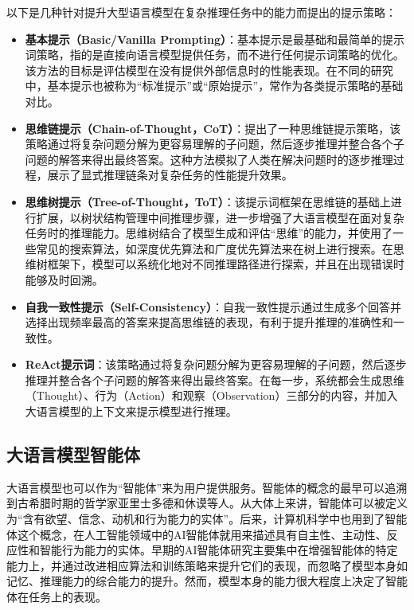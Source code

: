 以下是几种针对提升大型语言模型在复杂推理任务中的能力而提出的提示策略：

\begin{itemize}
    \item \textbf{基本提示（Basic/Vanilla Prompting）}：基本提示是最基础和最简单的提示词策略，指的是直接向语言模型提供任务，而不进行任何提示词策略的优化。该方法的目标是评估模型在没有提供外部信息时的性能表现。在不同的研究中，基本提示也被称为“标准提示”或“原始提示”，常作为各类提示策略的基础对比。
    \item \textbf{思维链提示（Chain-of-Thought，CoT）}：\cite{Wang2023a}提出了一种思维链提示策略，该策略通过将复杂问题分解为更容易理解的子问题，然后逐步推理并整合各个子问题的解答来得出最终答案。这种方法模拟了人类在解决问题时的逐步推理过程，展示了显式推理链条对复杂任务的性能提升效果。
    \item \textbf{思维树提示（Tree-of-Thought，ToT）}：该提示词框架在思维链的基础上进行扩展，以树状结构管理中间推理步骤，进一步增强了大语言模型在面对复杂任务时的推理能力。思维树结合了模型生成和评估“思维”的能力，并使用了一些常见的搜索算法，如深度优先算法和广度优先算法来在树上进行搜索。在思维树框架下，模型可以系统化地对不同推理路径进行探索，并且在出现错误时能够及时回溯。
    \item \textbf{自我一致性提示（Self-Consistency）}：自我一致性提示通过生成多个回答并选择出现频率最高的答案来提高思维链的表现，有利于提升推理的准确性和一致性。
    \item \textbf{ReAct提示词}：该策略通过将复杂问题分解为更容易理解的子问题，然后逐步推理并整合各个子问题的解答来得出最终答案。在每一步，系统都会生成思维（Thought）、行为（Action）和观察（Observation）三部分的内容，并加入大语言模型的上下文来提示模型进行推理。
\end{itemize}

\subsection{大语言模型智能体}

大语言模型也可以作为“智能体”来为用户提供服务。智能体的概念的最早可以追溯到古希腊时期的哲学家亚里士多德和休谟等人\cite{Zalta2019}。从大体上来讲，智能体可以被定义为“含有欲望、信念、动机和行为能力的实体”\cite{Xi2023}。后来，计算机科学中也用到了智能体这个概念，在人工智能领域中的AI智能体就用来描述具有自主性、主动性、反应性和智能行为能力的实体\cite{Wooldridge1995}。早期的AI智能体研究主要集中在增强智能体的特定能力上\cite{Sutton2018}，并通过改进相应算法和训练策略来提升它们的表现，而忽略了模型本身如记忆、推理能力的综合能力的提升。然而，模型本身的能力很大程度上决定了智能体在任务上的表现。

